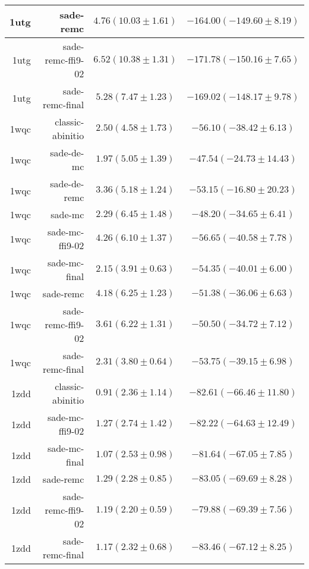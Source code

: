 \begin{table}
\begin{tabular}{r|r|c|c}
        1utg &          sade-remc & $4.76 ( 10.03 \pm   1.61)$ & $-164.00 (-149.60 \pm   8.19)$ \\ \hline
        1utg &  sade-remc-ffi9-02 & $6.52 ( 10.38 \pm   1.31)$ & $-171.78 (-150.16 \pm   7.65)$ \\ \hline
        1utg &    sade-remc-final & $5.28 (  7.47 \pm   1.23)$ & $-169.02 (-148.17 \pm   9.78)$ \\ \hline
        \hline
        1wqc &   classic-abinitio & $2.50 (  4.58 \pm   1.73)$ & $-56.10 (-38.42 \pm   6.13)$ \\ \hline
        1wqc &         sade-de-mc & $1.97 (  5.05 \pm   1.39)$ & $-47.54 (-24.73 \pm  14.43)$ \\ \hline
        1wqc &       sade-de-remc & $3.36 (  5.18 \pm   1.24)$ & $-53.15 (-16.80 \pm  20.23)$ \\ \hline
        1wqc &            sade-mc & $2.29 (  6.45 \pm   1.48)$ & $-48.20 (-34.65 \pm   6.41)$ \\ \hline
        1wqc &    sade-mc-ffi9-02 & $4.26 (  6.10 \pm   1.37)$ & $-56.65 (-40.58 \pm   7.78)$ \\ \hline
        1wqc &      sade-mc-final & $2.15 (  3.91 \pm   0.63)$ & $-54.35 (-40.01 \pm   6.00)$ \\ \hline
        1wqc &          sade-remc & $4.18 (  6.25 \pm   1.23)$ & $-51.38 (-36.06 \pm   6.63)$ \\ \hline
        1wqc &  sade-remc-ffi9-02 & $3.61 (  6.22 \pm   1.31)$ & $-50.50 (-34.72 \pm   7.12)$ \\ \hline
        1wqc &    sade-remc-final & $2.31 (  3.80 \pm   0.64)$ & $-53.75 (-39.15 \pm   6.98)$ \\ \hline
        \hline
        1zdd &   classic-abinitio & $0.91 (  2.36 \pm   1.14)$ & $-82.61 (-66.46 \pm  11.80)$ \\ \hline
        1zdd &    sade-mc-ffi9-02 & $1.27 (  2.74 \pm   1.42)$ & $-82.22 (-64.63 \pm  12.49)$ \\ \hline
        1zdd &      sade-mc-final & $1.07 (  2.53 \pm   0.98)$ & $-81.64 (-67.05 \pm   7.85)$ \\ \hline
        1zdd &          sade-remc & $1.29 (  2.28 \pm   0.85)$ & $-83.05 (-69.69 \pm   8.28)$ \\ \hline
        1zdd &  sade-remc-ffi9-02 & $1.19 (  2.20 \pm   0.59)$ & $-79.88 (-69.39 \pm   7.56)$ \\ \hline
        1zdd &    sade-remc-final & $1.17 (  2.32 \pm   0.68)$ & $-83.46 (-67.12 \pm   8.25)$ \\ \hline

\end{tabular}
\end{table}
